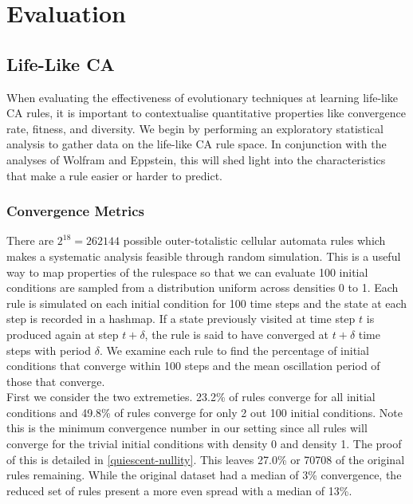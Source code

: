 \chapter{Evaluation} \label{evaluation}

\section{Life-Like CA}

When evaluating the effectiveness of evolutionary techniques at learning life-like CA rules, it is important to contextualise quantitative properties like convergence rate, fitness, and diversity. We begin by performing an exploratory statistical analysis to gather data on the life-like CA rule space. In conjunction with the analyses of Wolfram\cite{wolfram1986theory} and Eppstein\cite{eppstein2010growth}, this will shed light into the characteristics that make a rule easier or harder to predict.

\subsection{Convergence Metrics}
There are $2^{18} = 262144$ possible outer-totalistic cellular automata rules which makes a systematic analysis feasible through random simulation. This is a useful way to map properties of the rulespace so that we can evaluate  100 initial conditions are sampled from a distribution uniform across densities 0 to 1. Each rule is simulated on each initial condition for 100 time steps and the state at each step is recorded in a hashmap. If a state previously visited at time step $t$ is produced again at step $t+\delta$, the rule is said to have converged at $t+\delta$ time steps with period $\delta$. We examine each rule to find the percentage of initial conditions that converge within 100 steps and the mean oscillation period of those that converge.\\

First we consider the two extremeties. 23.2\% of rules converge for all initial conditions and 49.8\% of rules converge for only 2 out 100 initial conditions. Note this is the minimum convergence number in our setting since all rules will converge for the trivial initial conditions with density 0 and density 1. The proof of this is detailed in \ref{quiescent-nullity}. This leaves 27.0\% or 70708 of the original rules remaining. While the original dataset had a median of 3\% convergence, the reduced set of rules present a more even spread with a median of 13\%.

